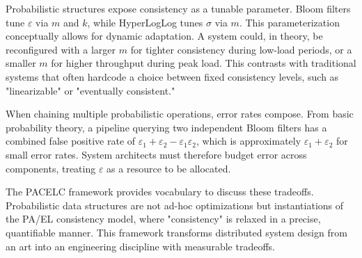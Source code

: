 Probabilistic structures expose consistency as a tunable parameter. Bloom filters tune $\varepsilon$ via $m$ and $k$, while HyperLogLog tunes $\sigma$ via $m$. This parameterization conceptually allows for dynamic adaptation. A system could, in theory, be reconfigured with a larger $m$ for tighter consistency during low-load periods, or a smaller $m$ for higher throughput during peak load. This contrasts with traditional systems that often hardcode a choice between fixed consistency levels, such as "linearizable" or "eventually consistent."

When chaining multiple probabilistic operations, error rates compose. From basic probability theory, a pipeline querying two independent Bloom filters has a combined false positive rate of $\varepsilon_1 + \varepsilon_2 - \varepsilon_1 \varepsilon_2$, which is approximately $\varepsilon_1 + \varepsilon_2$ for small error rates. System architects must therefore budget error across components, treating $\varepsilon$ as a resource to be allocated.

The PACELC framework provides vocabulary to discuss these tradeoffs. Probabilistic data structures are not ad-hoc optimizations but instantiations of the PA/EL consistency model, where "consistency" is relaxed in a precise, quantifiable manner. This framework transforms distributed system design from an art into an engineering discipline with measurable tradeoffs.

